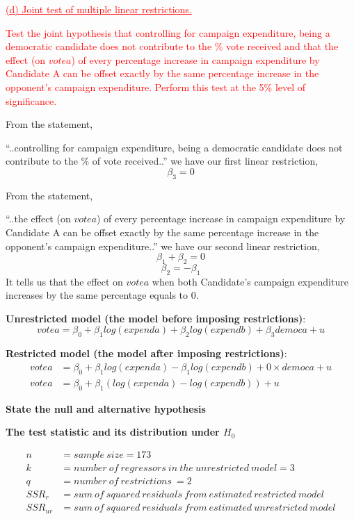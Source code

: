 \documentclass[12pt]{report}
\begin{document}
\newpage
\noindent \textcolor{red}
{
	\uline{(d) Joint test of multiple linear restrictions.}
}

\noindent \textcolor{red}
{
	Test the joint hypothesis that controlling for campaign expenditure, being a democratic candidate does not contribute to the \% vote received and that the effect (on $votea$) of every percentage increase in campaign expenditure by Candidate A can be offset exactly by the same percentage increase in the opponent’s campaign expenditure. Perform this test at the 5\% level of significance.
}

\noindent From the statement,

\centering
“..controlling for campaign expenditure, being a democratic candidate does not contribute to the \% of vote received..”
\vspace{-\baselineskip}
\justify
we have our first linear restriction,
$$\beta_3 = 0$$

\noindent From the statement,

\centering
“..the effect (on $votea$) of every percentage increase in campaign expenditure by Candidate A can be offset exactly by the same percentage increase in the opponent’s campaign expenditure..”
\vspace{-\baselineskip}
\justify
we have our second linear restriction,
$$\beta_1 + \beta_2 = 0$$
$$\beta_2 = -\beta_1$$
\noindent It tells us that the effect on $votea$ when both Candidate's campaign expenditure increases by the same percentage equals to 0.
\vspace{10mm}

\noindent \textbf{Unrestricted model (the model before imposing restrictions)}:
$$votea = \beta_0 + \beta_1log(expenda) + \beta_2log(expendb) + \beta_3democa + u$$

\noindent \textbf{Restricted model (the model after imposing restrictions)}:
\begin{align*}
	votea &= \beta_0 + \beta_1log(expenda) - \beta_1log(expendb) + 0{\times}democa + u \\
	votea &= \beta_0 + \beta_1(log(expenda) - log(expendb)) + u
\end{align*}

\newpage
\noindent \textbf{State the null and alternative hypothesis}
\vspace{20mm}

\noindent \textbf{The test statistic and its distribution under $H_0$}
\vspace{10mm}

\begin{align*}
n &= sample\ size = 173 \\
k &= number\ of\ regressors\ in\ the\ unrestricted\ model = 3 \\
q &= number\ of\ restrictions\ = 2 \\
SSR_{r} &= sum\ of\ squared\ residuals\ from\ estimated\ restricted\ model \\
SSR_{ur} &= sum\ of\ squared\ residuals\ from\ estimated\ unrestricted\ model
\end{align*}
\end{document}

